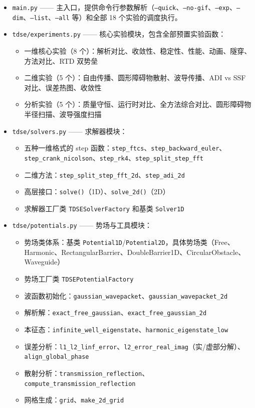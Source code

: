 \documentclass[12pt,a4paper]{article}
\begin{document}
\begin{itemize}
    \item \texttt{main.py} —— 主入口，提供命令行参数解析（\texttt{--quick}、\texttt{--no-gif}、\texttt{--exp}、\texttt{--dim}、\texttt{--list}、\texttt{--all} 等）和全部 18 个实验的调度执行。

    \item \texttt{tdse/experiments.py} —— 核心实验模块，包含全部预置实验函数：
    \begin{itemize}
        \item 一维核心实验（8 个）：解析对比、收敛性、稳定性、性能、动画、隧穿、方法对比、RTD 双势垒
        \item 二维实验（5 个）：自由传播、圆形障碍物散射、波导传播、ADI vs SSF 对比、误差热图、收敛性
        \item 分析实验（5 个）：质量守恒、运行时对比、全方法综合对比、圆形障碍物半径扫描、波导强度扫描
    \end{itemize}

    \item \texttt{tdse/solvers.py} —— 求解器模块：
    \begin{itemize}
        \item 五种一维格式的 step 函数：\texttt{step\_ftcs}、\texttt{step\_backward\_euler}、\texttt{step\_crank\_nicolson}、\texttt{step\_rk4}、\texttt{step\_split\_step\_fft}
        \item 二维方法：\texttt{step\_split\_step\_fft\_2d}、\texttt{step\_adi\_2d}
        \item 高层接口：\texttt{solve()}（1D）、\texttt{solve\_2d()}（2D）
        \item 求解器工厂类 \texttt{TDSESolverFactory} 和基类 \texttt{Solver1D}
    \end{itemize}

    \item \texttt{tdse/potentials.py} —— 势场与工具模块：
    \begin{itemize}
        \item 势场类体系：基类 \texttt{Potential1D}/\texttt{Potential2D}，具体势场类（Free、Harmonic、RectangularBarrier、DoubleBarrier1D、CircularObstacle、Waveguide）
        \item 势场工厂类 \texttt{TDSEPotentialFactory}
        \item 波函数初始化：\texttt{gaussian\_wavepacket}、\texttt{gaussian\_wavepacket\_2d}
        \item 解析解：\texttt{exact\_free\_gaussian}、\texttt{exact\_free\_gaussian\_2d}
        \item 本征态：\texttt{infinite\_well\_eigenstate}、\texttt{harmonic\_eigenstate\_low}
        \item 误差分析：\texttt{l1\_l2\_linf\_error}、\texttt{l2\_error\_real\_imag}（实/虚部分解）、\texttt{align\_global\_phase}
        \item 散射分析：\texttt{transmission\_reflection}、\texttt{compute\_transmission\_reflection}
        \item 网格生成：\texttt{grid}、\texttt{make\_2d\_grid}
    \end{itemize}


\end{itemize}
\end{document}

